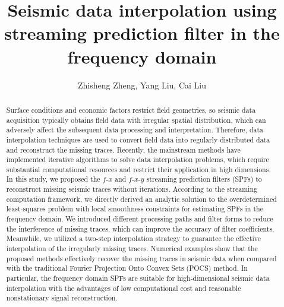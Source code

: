 
\title{Seismic data interpolation using streaming prediction filter in the frequency domain}

\renewcommand{\thefootnote}{\fnsymbol{footnote}}


\address{
    \footnotemark[1] College of Geo-exploration Science and Technology,\\
    Jilin University, Changchun, China}

\author{Zhisheng Zheng\footnotemark[1], Yang Liu\footnotemark[1], Cai Liu\footnotemark[1]}


\maketitle

\begin{abstract}
  Surface conditions and economic factors restrict field geometries,
  so seismic data acquisition typically obtains field data with
  irregular spatial distribution, which can adversely affect the
  subsequent data processing and interpretation. Therefore, data
  interpolation techniques are used to convert field data into
  regularly distributed data and reconstruct the missing traces.
  Recently, the mainstream methods have implemented iterative
  algorithms to solve data interpolation problems, which require
  substantial computational resources and restrict their application
  in high dimensions.  In this study, we proposed the $f$-$x$ and
  $f$-$x$-$y$ streaming prediction filters (SPFs) to reconstruct
  missing seismic traces without iterations. According to the
  streaming computation framework, we directly derived an analytic
  solution to the overdetermined least-squares problem with local
  smoothness constraints for estimating SPFs in the frequency
  domain. We introduced different processing paths and filter forms to
  reduce the interference of missing traces, which can improve the
  accuracy of filter coefficients. Meanwhile, we utilized a two-step
  interpolation strategy to guarantee the effective interpolation of
  the irregularly missing traces.  Numerical examples show that the
  proposed methods effectively recover the missing traces in seismic
  data when compared with the traditional Fourier Projection Onto
  Convex Sets (POCS) method. In particular, the frequency domain SPFs
  are suitable for high-dimensional seismic data interpolation with
  the advantages of low computational cost and reasonable
  nonstationary signal reconstruction.

\end{abstract}



